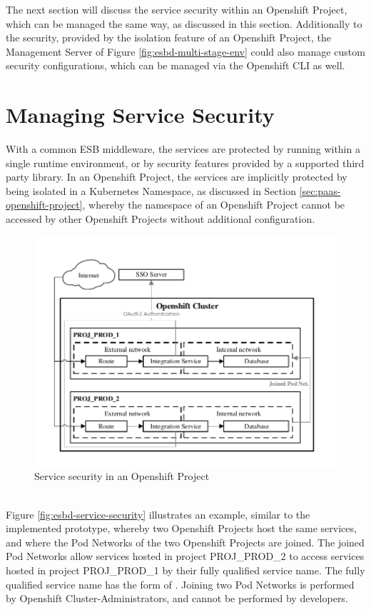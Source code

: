The next section will discuss the service security within an Openshift Project, which can be managed the same way, as discussed in this section. Additionally to the security, provided by the isolation feature of an Openshift Project, the Management Server of Figure \vref{fig:esbd-multi-stage-env} could also manage custom security configurations, which can be managed via the Openshift CLI as well. 

\section{Managing Service Security}
\label{sec:esbd-service-security}
With a common ESB middleware, the services are protected by running within a single runtime environment, or by security features provided by a supported third party library. In an Openshift Project, the services are implicitly protected by being isolated in a Kubernetes Namespace, as discussed in Section \vref{sec:paas-openshift-project}, whereby the namespace of an Openshift Project cannot be accessed by other Openshift Projects without additional configuration.
\newpage

\begin{figure}[htbp]
	\centering
	\includegraphics[scale=1]{images/esbd-service-security.pdf}
	\caption{Service security in an Openshift Project}
	\label{fig:esbd-service-security}
\end{figure}
\ \\
Figure \vref{fig:esbd-service-security} illustrates an example, similar to the implemented prototype, whereby two Openshift Projects host the same services, and where the Pod Networks of the two Openshift Projects are joined. The joined Pod Networks allow services hosted in project PROJ\_PROD\_2 to access services hosted in project PROJ\_PROD\_1 by their fully qualified service name. The fully qualified service name has the form of . Joining two Pod Networks is performed by Openshift Cluster-Administrators, and cannot be performed by developers. \\

